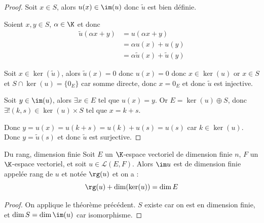 \begin{proof}
    Soit $x \in S$, alors $u(x) \in \im (u)$ donc $\tilde u$ est bien définie.

    Soient $x, y \in S$, $\alpha \in \K$ et donc 
    \begin{align}
        \tilde u (\alpha x + y) & = u(\alpha x + y) \\
        & = \alpha u(x) + u(y) \\
        & = \alpha \tilde u (x) + \tilde u (y)
    \end{align}

    Soit $x \in \ker (\tilde u)$, alors $\tilde u(x) = 0$ donc $u(x) = 0$ 
    donc $x \in \ker (u) $ or $x \in S$ et $S \cap \ker (u) = \{0_E\}$ car 
    somme directe, donc $x = 0_E$ et donc $\tilde u$ est injective.

    \lvspace Soit $y \in \im (u)$, alors $\exists x \in E$ tel que $u(x) = y$.
    Or $E = \ker (u) \oplus S$, donc $\exists ! (k, s) \in \ker (u) \times S$ tel que
    $x = k + s$. 

    Donc $y = u(x) = u(k + s) = u(k) + u(s) = u(s)$ car $k \in \ker (u)$.
    Donc $y = \tilde u (s)$ et donc $\tilde u$ est surjective.
\end{proof}

\begin{theoreme}{Du rang, dimension finie}{}
    Soit $E$ un $\K$-espace vectoriel de dimension finie $n$, $F$ un $\K$-espace vectoriel, 
    et soit $u \in \mathscr L(E, F)$. Alors $\im u $ est de dimension finie appelée 
    rang de $u$ et notée $\rg(u)$ et on a :
    \[
        \rg(u) + \dim(\ker(u)) = \dim E
    \]
\end{theoreme}


\begin{proof}
    On applique le théorème précédent. $S$ existe car on est en dimension finie,
    et $\dim S = \dim \im (u)$ car isomorphisme.
\end{proof}

